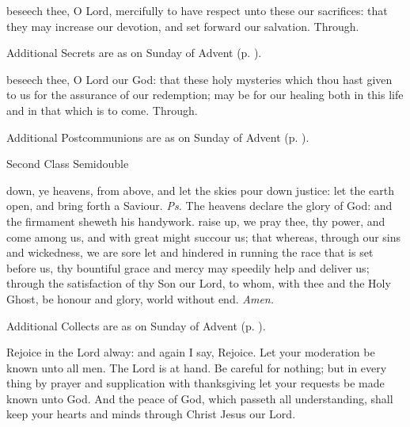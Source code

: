 \secret
{} beseech thee, O Lord, mercifully to have respect unto these our sacrifices: that they may increase our devotion, and set forward our salvation. Through.
\begin{rubric}
    Additional Secrets are as on  Sunday of Advent (p. \pageref{AdventI}).
\end{rubric}
\postcommunion
{} beseech thee, O Lord our God: that these holy mysteries which thou hast given to us for the assurance of our redemption; may be for our healing both in this life and in that which is to come. Through.
\begin{rubric}
    Additional Postcommunions are as on  Sunday of Advent (p. \pageref{AdventI}).
\end{rubric}
\begin{inhead}
{Second Class Semidouble}
\end{inhead}
\fancyhead[RE,LO]{}
\par\noindent
{}
\vspace{-1ex}
\introit
{} down, ye heavens, from above, and let the skies pour down justice: let the earth open, and bring forth a Saviour. \textit{Ps.} The heavens declare the glory of God: and the firmament sheweth his handywork.
\vspace{-1ex}
\collect
{} raise up, we pray thee, thy power, and come among us, and with great might succour us; that whereas, through our sins and wickedness, we are sore let and hindered in running the race that is set before us, thy bountiful grace and mercy may speedily help and deliver us; through the satisfaction of thy Son our Lord, to whom, with thee and the Holy Ghost, be honour and glory, world without end. \textit{Amen.}
\begin{rubric}
    Additional Collects are as on  Sunday of Advent (p. \pageref{AdventI}).
\end{rubric}
\vspace{-1ex}
 Rejoice in the Lord alway: and again I say, Rejoice. Let your moderation be known unto all men. The Lord is at hand. Be careful for nothing; but in every thing by prayer and supplication with thanksgiving let your requests be made known unto God. And the peace of God, which passeth all understanding, shall keep your hearts and minds through Christ Jesus our Lord.

